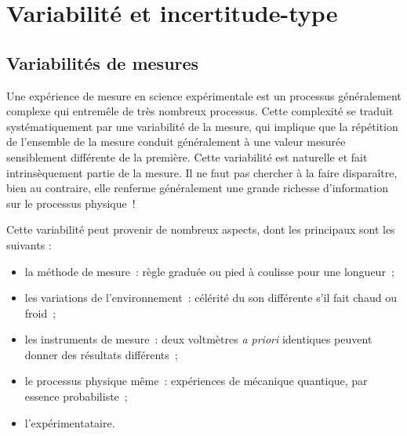 \documentclass[../main/main.tex]{subfiles}
\begin{document}
\vfill
\minitoc
\vfill

\newpage


\section{Variabilité et incertitude-type}
\subsection{Variabilités de mesures}
Une expérience de mesure en science expérimentale est un processus généralement
complexe qui entremêle de très nombreux processus. Cette complexité se traduit
systématiquement par une variabilité de la mesure, qui implique que la
répétition de l'ensemble de la mesure conduit généralement à une valeur mesurée
sensiblement différente de la première. Cette variabilité est naturelle et fait
intrinsèquement partie de la mesure. Il ne faut pas chercher à la faire
disparaître, bien au contraire, elle renferme généralement une grande richesse
d'information sur le processus physique~!

Cette variabilité peut provenir de nombreux aspects, dont les principaux sont
les suivants :
\begin{itemize}[label=$\diamond$, leftmargin=10pt]
	\item la méthode de mesure~: règle graduée ou pied à coulisse pour une
	      longueur~;
	\item les variations de l'environnement~: célérité du son différente s'il fait
	      chaud ou froid~;
	\item les instruments de mesure~: deux voltmètres \textit{a priori} identiques
	      peuvent donner des résultats différents~;
	\item le processus physique même~: expériences de mécanique quantique, par
	      essence probabiliste~;
	\item l'expérimentataire.
\end{itemize}
\end{document}
